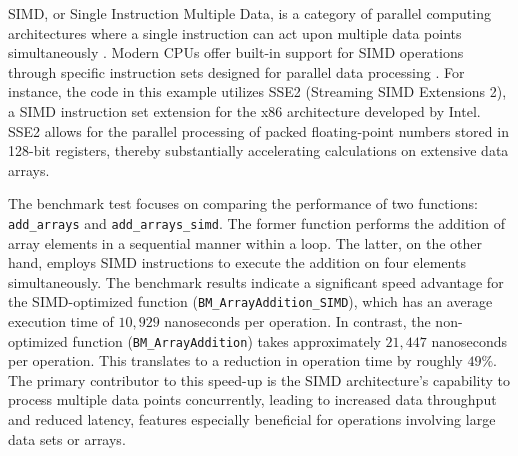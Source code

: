 \documentclass{article}
\theoremstyle{break}
\begin{document}

SIMD, or Single Instruction Multiple Data, is a category of parallel computing architectures where a single instruction can act upon multiple data points simultaneously \cite{flynn}. Modern CPUs offer built-in support for SIMD operations through specific instruction sets designed for parallel data processing \cite{asaduzzaman}. For instance, the code in this example utilizes SSE2 (Streaming SIMD Extensions 2), a SIMD instruction set extension for the x86 architecture developed by Intel. SSE2 allows for the parallel processing of packed floating-point numbers stored in 128-bit registers, thereby substantially accelerating calculations on extensive data arrays.

The benchmark test focuses on comparing the performance of two functions: \texttt{add\_arrays} and \texttt{add\_arrays\_simd}. The former function performs the addition of array elements in a sequential manner within a loop. The latter, on the other hand, employs SIMD instructions to execute the addition on four elements simultaneously. The benchmark results indicate a significant speed advantage for the SIMD-optimized function (\texttt{BM\_ArrayAddition\_SIMD}), which has an average execution time of \(10,929\) nanoseconds per operation. In contrast, the non-optimized function (\texttt{BM\_ArrayAddition}) takes approximately \(21,447\) nanoseconds per operation. This translates to a reduction in operation time by roughly \(49\%\). The primary contributor to this speed-up is the SIMD architecture's capability to process multiple data points concurrently, leading to increased data throughput and reduced latency, features especially beneficial for operations involving large data sets or arrays.
\end{document}
